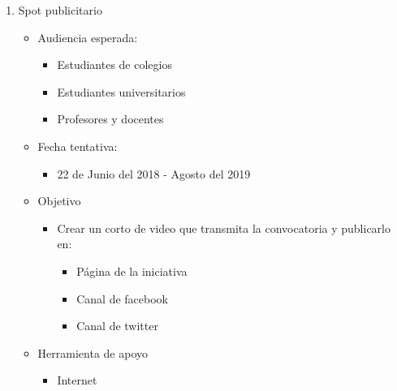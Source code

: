 \documentclass{article}
\begin{document}
\begin{enumerate}
\item Spot publicitario 
\begin{itemize}
\item Audiencia esperada:
\begin{itemize}
\item Estudiantes de colegios
\item Estudiantes universitarios
\item Profesores y docentes
\end{itemize}
\item Fecha tentativa:
\begin{itemize}
\item 22 de Junio del 2018 - Agosto del 2019
\end{itemize}
\item Objetivo
\begin{itemize}
\item Crear un corto de video que transmita la convocatoria y publicarlo en:
\begin{itemize}
\item Página de la iniciativa 
\item Canal de facebook
\item Canal de twitter
\end{itemize}
\end{itemize}
\item Herramienta de apoyo
\begin{itemize}
\item Internet
\end{itemize}
\end{itemize}


\end{enumerate}
\end{document}

